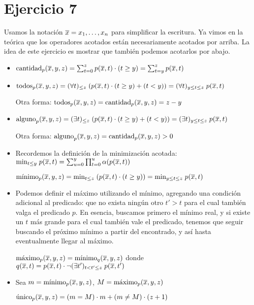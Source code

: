 \section*{Ejercicio 7}

Usamos la notación $\overline{x} = x_1, \dots, x_n$ para simplificar la escritura. Ya vimos en la teórica que los operadores acotados están necesariamente acotados por arriba. La idea de este ejercicio es mostrar que también podemos acotarlos por abajo.

\begin{itemize}
    \item $\text{cantidad}_p(\overline{x}, y, z) = \sum_{t=0}^z p(\overline{x}, t) \cdot (t \geq y) = \sum_{t=y}^z p(\overline{x}, t)$

    \item $\text{todos}_p(\overline{x}, y, z) = (\forall t)_{\leq z} \; (p(\overline{x}, t) \cdot (t \geq y) + (t < y)) = (\forall t)_{y \leq t \leq z} \; p(\overline{x}, t)$

    Otra forma: $\text{todos}_p(\overline{x}, y, z) = \text{cantidad}_p(\overline{x}, y, z) = z - y$

    \item $\text{alguno}_p(\overline{x}, y, z) = (\exists t)_{\leq z} \; (p(\overline{x}, t) \cdot (t \geq y) + (t < y)) = (\exists t)_{y \leq t \leq z} \; p(\overline{x}, t)$

    Otra forma: $\text{alguno}_p(\overline{x}, y, z) = \text{cantidad}_p(\overline{x}, y, z) > 0$

    \item Recordemos la definición de la minimización acotada: $\text{min}_{t \leq y} \; p(\overline{x}, t) = \sum_{u=0}^y \prod_{t=0}^u \alpha(p(\overline{x}, t))$

    $\text{mínimo}_p(\overline{x}, y, z) = \text{min}_{t \leq z} \; (p(\overline{x}, t) \cdot (t \geq y)) = \text{min}_{y \leq t \leq z} \; p(\overline{x}, t)$

    \item Podemos definir el máximo utilizando el mínimo, agregando una condición adicional al predicado: que no exista ningún otro $t' > t$ para el cual también valga el predicado $p$. En esencia, buscamos primero el mínimo real, y si existe un $t$ más grande para el cual también vale el predicado, tenemos que seguir buscando el próximo mínimo a partir del encontrado, y así hasta eventualmente llegar al máximo.

    $\text{máximo}_p(\overline{x}, y, z) = \text{mínimo}_q(\overline{x}, y, z)$ donde $q(\overline{x}, t) = p(\overline{x}, t) \cdot \neg (\exists t')_{t < t' \leq z} \; p(\overline{x}, t')$

    \item Sea $m = \text{mínimo}_p(\overline{x}, y, z)$, $M = \text{máximo}_p(\overline{x}, y, z)$

    $\text{único}_p(\overline{x}, y, z) = (m = M) \cdot m + (m \neq M) \cdot (z + 1)$
\end{itemize}
